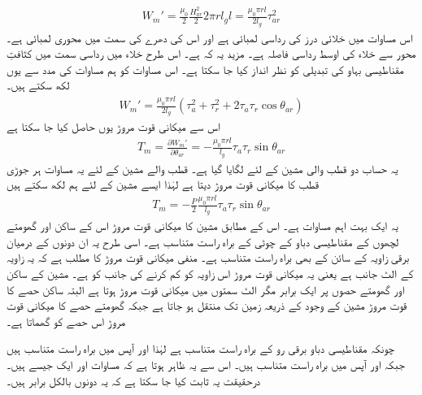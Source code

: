 \begin{align}
W_m'=\frac{\mu_0}{2} \frac{H_{ar}^2}{2} 2 \pi r l_g l=\frac{\mu_0 \pi r l}{2l_g} \tau_{ar}^2
\end{align}
اس مساوات میں خلائی درز کی رداسی لمبائی  ہے اور اس کی دھرے کی سمت میں محوری لمبائی  ہے۔ محور سے خلاء کی اوسط رداسی فاصلہ  ہے۔ مزید یہ کہ  ہے۔ اس طرح خلاء میں رداسی سمت میں کثافتِ مقناطیسی بہاو کی تبدیلی کو نظر انداز کیا جا سکتا ہے۔ اس مساوات کو ہم مساوات   کی مدد سے یوں لکھ سکتے ہیں۔
\begin{align}
W_m'=\frac{\mu_0 \pi r l}{2 l_g} \left(\tau_a^2+\tau_r^2+2\tau_a \tau_r \cos \theta_{ar} \right) 
\end{align}
اس سے میکانی قوت مروڑ یوں حاصل کیا جا سکتا ہے
\begin{align}\label{مساوات_گھومتے_مشین_مروڑ_کوتوانائی_سے}
T_m=\frac{\partial W_m'}{\partial \theta_{ar}}=-\frac{\mu_0 \pi r l}{l_g} \tau_a \tau_r \sin \theta_{ar}
\end{align}
یہ حساب دو قطب والی مشین کے لئے لگایا گیا ہے۔ قطب والے مشین کے لئے یہ مساوات ہر جوڑی قطب کا میکانی قوت مروڑ دیتا ہے لہٰذا ایسے مشین کے لئے ہم لکھ سکتے ہیں
\begin{align}\label{مساوات_گھومتے_مشین_مروڑ_بذریعہ_کوتوانائی_الف}
T_m=-\frac{P}{2}\frac{\mu_0 \pi r l}{l_g} \tau_a \tau_r \sin \theta_{ar}
\end{align}
یہ ایک بہت اہم مساوات ہے۔ اس کے مطابق مشین کا میکانی قوت مروڑ اس کے ساکن اور گھومتے لچھوں کے مقناطیسی دباو کے چوٹی کے براہ راست متناسب ہے۔ اسی طرح یہ ان دونوں کے درمیان برقی زاویہ  کے سائن کے بھی براہ راست متناسب ہے۔ منفی میکانی قوت مروڑ کا مطلب ہے کہ یہ زاویہ   کے الٹ جانب ہے یعنی یہ میکانی قوت مروڑ اس زاویہ کو کم کرنے کی جانب کو ہے۔ مشین کے ساکن اور گھومتے حصوں پر ایک برابر مگر الٹ سمتوں میں میکانی قوت مروڑ ہوتا ہے البتہ ساکن حصے کا قوت مروڑ مشین کے وجود کے ذریعہ زمین تک منتقل ہو جاتا ہے جبکہ گھومتے حصے کا میکانی قوت مروڑ اس حصے کو گھماتا ہے۔

چونکہ مقناطیسی دباو برقی رو کے براہ راست متناسب ہے لہٰذا   اور  آپس میں براہ راست متناسب ہیں جبکہ  اور  آپس میں براہ راست متناسب ہیں۔ اس سے یہ ظاہر ہوتا ہے کہ مساوات   اور   ایک جیسے ہیں۔ درحقیقت یہ ثابت کیا جا سکتا ہے کہ یہ دونوں بالکل برابر ہیں۔

